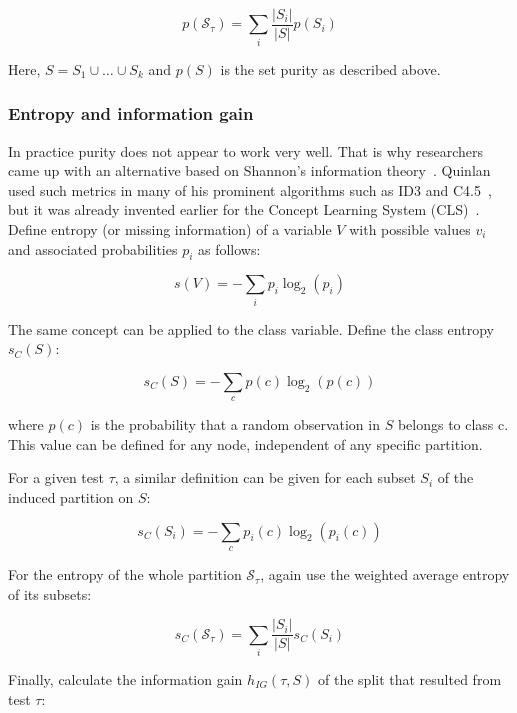 \begin{equation}
    p(\mathcal{S}_\tau) = \sum_i \frac{|S_i|}{|S|} p(S_i)
\end{equation}

Here, $S = S_1 \cup \ldots \cup S_k$ and $p(S)$ is the set purity as described above.

\subsubsection{Entropy and information gain}
In practice purity does not appear to work very well. That is why researchers came up with an alternative based on Shannon's information theory~\cite{shannon1948mathematical}. Quinlan used such metrics in many of his prominent algorithms such as ID3 and C4.5~\cite{id3ter, c45}, but it was already invented earlier for the Concept Learning System (CLS)~\cite{cls}. Define entropy (or missing information) of a variable $V$ with possible values $v_i$ and associated probabilities $p_i$ as follows:

\begin{equation}
    s(V) = - \sum_i p_i \log_2(p_i)
\end{equation}

The same concept can be applied to the class variable. Define the class entropy $s_C(S)$:

\begin{equation}
    s_C(S) = - \sum_c p(c) \log_2(p(c))
\end{equation}

where $p(c)$ is the probability that a random observation in $S$ belongs to class c. This value can be defined for any node, independent of any specific partition.

For a given test $\tau$, a similar definition can be given for each subset $S_i$ of the induced partition on $S$:

\begin{equation}
    s_C(S_i) = - \sum_c p_i(c) \log_2(p_i(c))
\end{equation}

For the entropy of the whole partition $\mathcal{S}_\tau$, again use the weighted average entropy of its subsets:

\begin{equation}
    s_C(\mathcal{S}_\tau) = \sum_i \frac{|S_i|}{|S|} s_C(S_i)
\end{equation}

Finally, calculate the information gain $h_{IG}(\tau, S)$ of the split that resulted from test $\tau$:

